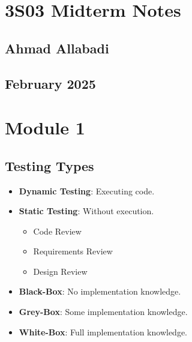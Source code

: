 \documentclass[10pt,portrait]{article}
\begin{document}
\small

\begin{multicols}{ 2 }
\section*{3S03 Midterm Notes}
\subsection*{Ahmad Allabadi}
\subsection*{February 2025}

\section{Module 1}

\subsection{Testing Types}
\begin{itemize}
    \item \textbf{Dynamic Testing}: Executing code.
    \item \textbf{Static Testing}: Without execution.
    \begin{itemize}
        \item Code Review
        \item Requirements Review
        \item Design Review
    \end{itemize}
    \item \textbf{Black-Box}: No implementation knowledge.
    \item \textbf{Grey-Box}: Some implementation knowledge.
    \item \textbf{White-Box}: Full implementation knowledge.
\end{itemize}


\end{multicols}
\end{document}
